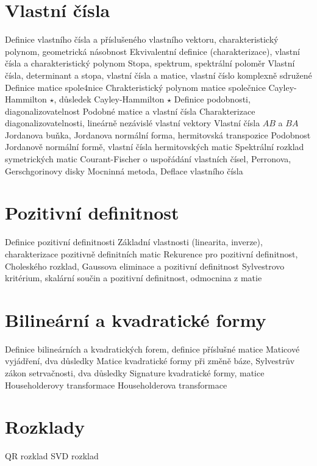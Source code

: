 \documentclass[a4paper]{article}
\begin{document}
\section{Vlastní čísla}
\begin{itemize}
    \itemd Definice vlastního čísla a příslušeného vlastního vektoru, charakteristický polynom, geometrická násobnost
    \itemv Ekvivalentní definice (charakterizace), vlastní čísla a charakteristický polynom
    \itemd Stopa, spektrum, spektrální poloměr
    \itemv Vlastní čísla, determinant a stopa, vlastní čísla a matice, vlastní číslo komplexně sdružené
    \itemd Definice matice spole4nice
    \itemv Chrakteristický polynom matice společnice
    \itemv Cayley-Hammilton $\star$, důsledek Cayley-Hammilton $\star$
    \itemd Definice podobnosti, diagonalizovatelnost
    \itemv Podobné matice a vlastní čísla
    \itemv Charakterizace diagonalizovatelnosti, lineárně nezávislé vlastní vektory
    \itemv Vlastní čísla $AB$ a $BA$
    \itemd Jordanova buňka, Jordanova normální forma, hermitovská transpozice
    \itemv Podobnost Jordanově normální formě, vlastní čísla hermitovských matic
    \itemv Spektrální rozklad symetrických matic
    \itemv Courant-Fischer o uspořádání vlastních čísel, Perronova, Gerschgorinovy disky
    \itemv Mocninná metoda, Deflace vlastního čísla
\end{itemize}

\section{Pozitivní definitnost}
\begin{itemize}
    \itemd Definice pozitivní definitnosti
    \itemv Základní vlastnosti (linearita, inverze), charakterizace pozitivně definitních matic
    \itemv Rekurence pro pozitivní definitnost, Choleského rozklad, Gaussova eliminace a pozitivní definitnost
    \itemv Sylvestrovo kritérium, skalární součin a pozitivní definitnost, odmocnina z matie
\end{itemize}

\section{Bilineární a kvadratické formy}
\begin{itemize}
    \itemd Definice bilineárních a kvadratických forem, definice příslušné matice
    \itemv Maticové vyjádření, dva důsledky
    \itemv Matice kvadratické formy při změně báze, Sylvestrův zákon setrvačnosti, dva důsledky
    \itemd Signature kvadratické formy, matice Householderovy transformace
    \itemv Householderova transformace
\end{itemize}

\section{Rozklady}
\begin{itemize}
    \itemv QR rozklad
    \itemv SVD rozklad
\end{itemize}

\renewcommand{\itemv}{} \renewcommand{\itemd}{} %
\end{document}
